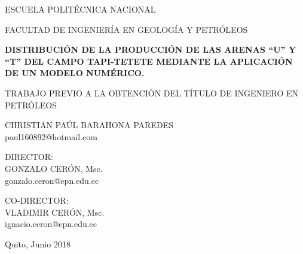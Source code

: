 \documentclass[a4paper,openright,12pt]{report}
\begin{document}
\begin{titlepage}
\begin{center}
\vspace*{-1in}
\begin{figure}[htb]
\begin{center}

\end{center}
\end{figure}
\begin{Large}
ESCUELA POLITÉCNICA NACIONAL\\
\end{Large}
\vspace*{2.3 cm}
\begin{Large}
FACULTAD DE INGENIERÍA EN GEOLOGÍA Y PETRÓLEOS\\
\end{Large}
\vspace*{2.3 cm}
\begin{Large}
\textbf{DISTRIBUCIÓN DE LA PRODUCCIÓN DE LAS ARENAS ``U'' Y ``T'' DEL CAMPO TAPI-TETETE MEDIANTE LA APLICACIÓN DE UN MODELO NUMÉRICO.} \\
\end{Large}
\vspace*{2.2 cm}

\begin{large}
TRABAJO PREVIO A LA OBTENCIÓN DEL TÍTULO DE INGENIERO EN PETRÓLEOS \\
\end{large}
\vspace*{2 cm}
\begin{large}
CHRISTIAN PAÚL BARAHONA PAREDES \\ [0.45 cm]
paul160892@hotmail.com\\
\end{large}
\vspace*{1.4 cm}
\begin{large}
DIRECTOR:  \\
GONZALO CERÓN, Msc. \\ [0.4 cm]
gonzalo.ceron@epn.edu.ec \\[1.4 cm]
\end{large}
\begin{large}
CO-DIRECTOR:  \\
VLADIMIR CERÓN, Msc. \\ [0.4 cm]
ignacio.ceron@epn.edu.ec\\[0.4 cm]
\end{large}
\begin{large}
Quito, Junio 2018\\ [1.4 cm]
\end{large}
\end{center}
\end{titlepage}
\end{document}
